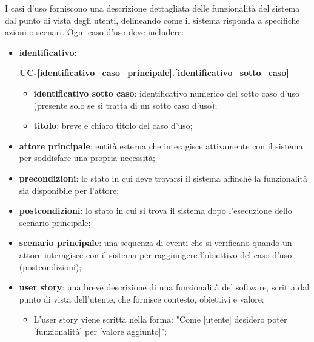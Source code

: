 I casi d'uso forniscono una descrizione dettagliata delle funzionalità del sistema dal punto di vista degli utenti, delineando come il sistema risponda a specifiche azioni o scenari. Ogni caso d'uso deve includere:
\begin{itemize}
	\item \textbf{identificativo}:
	      \begin{center}
		      \textbf{UC-[identificativo\_caso\_principale].[identificativo\_sotto\_caso]}
	      \end{center}
	      \begin{itemize}
		      \item \textbf{identificativo sotto caso}: identificativo numerico del sotto caso d'uso (presente solo se si tratta di un sotto caso d'uso);
		      \item \textbf{titolo}: breve e chiaro titolo del caso d'uso;
	      \end{itemize}
	\item \textbf{attore principale}: entità esterna che interagisce attivamente con il sistema per soddisfare una propria necessità;
	\item \textbf{precondizioni}: lo stato in cui deve trovarsi il sistema affinché la funzionalità sia disponibile per l'attore;
	\item \textbf{postcondizioni}: lo stato in cui si trova il sistema dopo l'esecuzione dello scenario principale;
	\item \textbf{scenario principale}: una sequenza di eventi che si verificano quando un attore interagisce con il sistema per raggiungere l'obiettivo del caso d'uso (postcondizioni);
	\item \textbf{user story}: una breve descrizione di una funzionalità del software, scritta dal punto di vista dell'utente, che fornisce contesto, obiettivi e valore:
	      \begin{itemize}
		      \item L'user story viene scritta nella forma: "Come [utente] desidero poter [funzionalità] per [valore aggiunto]";
	      \end{itemize}
\end{itemize}

